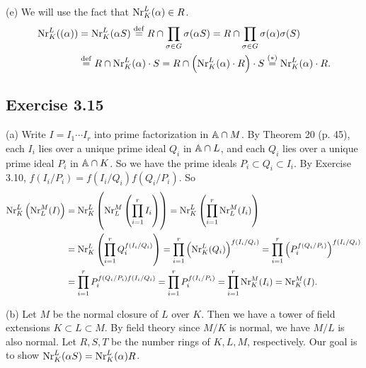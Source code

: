 \documentclass[../Marcus.tex]{subfiles}
\begin{document}
(e) We will use the fact that $\Nr^L_K(\alpha)\in R$.
\begin{align*}
    \Nr^L_K((\alpha))
	&= \Nr^L_K(\alpha S)
	\overset{\df}{=} R\cap \prod_{\sigma\in G}\sigma(\alpha S)
	= R\cap \prod_{\sigma\in G}\sigma(\alpha)\sigma(S)    \\
    &\overset{\df}{=} R\cap \Nr^L_K(\alpha)\cdot S
	= R\cap\left(\Nr^L_K(\alpha)\cdot R\right)\cdot S
    \overset{(*)}{=} \Nr^L_K(\alpha)\cdot R.
\end{align*}

\subsection*{Exercise 3.15}

(a) Write $I=I_1\cdots I_r$ into prime factorization in $\AA\cap M$. By Theorem 20 (p. 45), each $I_i$ lies over a unique prime ideal $Q_i$ in $\AA\cap L$, and each $Q_i$ lies over a unique prime ideal $P_i$ in $\AA\cap K$. So we have the prime ideals $P_i\subset Q_i\subset I_i$. By Exercise 3.10, $f(I_i/P_i)=f(I_i/Q_i)f(Q_i/P_i)$. So
\begin{align*}
    \Nr^L_K\left(\Nr^M_L(I)\right)
	&= \Nr^L_K\left(\Nr^M_L\left(\prod_{i=1}^r I_i\right)\right)
	= \Nr^L_K\left(\prod_{i=1}^r \Nr^M_L(I_i)\right)     \\ 
    &= \Nr^L_K\left(\prod_{i=1}^r Q_i^{f(I_i/Q_i)}\right)
	= \prod_{i=1}^r \left(\Nr^L_K(Q_i)\right)^{f(I_i/Q_i)}
	= \prod_{i=1}^r \left(P_i^{f(Q_i/P_i)}\right)^{f(I_i/Q_i)}      \\
    &= \prod_{i=1}^r P_i^{f(Q_i/P_i)f(I_i/Q_i)}
	= \prod_{i=1}^r P_i^{f(I_i/P_i)}
	= \prod_{i=1}^r \Nr^M_K(I_i)
	= \Nr^M_K(I).
\end{align*}

(b) Let $M$ be the normal closure of $L$ over $K$. Then we have a tower of field extensions $K\subset L\subset M$. By field theory since $M/K$ is normal, we have $M/L$ is also normal. Let $R,S,T$ be the number rings of $K,L,M$, respectively. Our goal is to show $\Nr^L_K(\alpha S)=\Nr^L_K(\alpha)R$.
\end{document}
